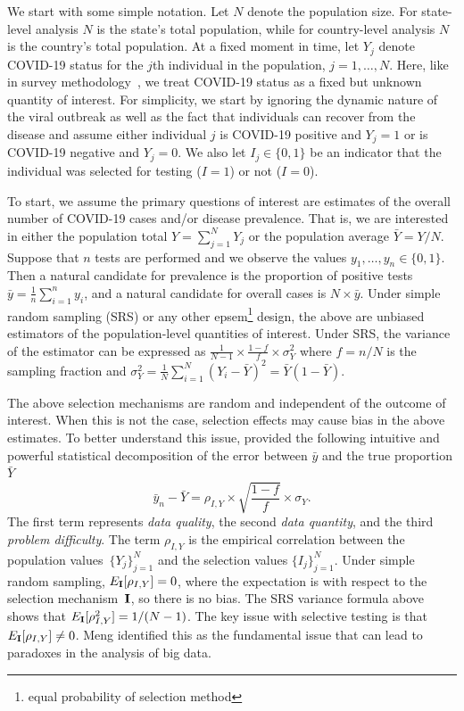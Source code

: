 \documentclass[aoas]{amsart}
\def\I{\bf I}
\begin{document}
We start with some simple notation.  Let $N$ denote the population size.  For state-level analysis $N$ is the state's total population, while for country-level analysis $N$ is the country's total population.  At a fixed moment in time, let $Y_j$ denote COVID-19 status for the $j$th individual in the population, $j=1,\ldots, N$. Here, like in survey methodology~\citep{Cochran77}, we treat COVID-19 status as a fixed but unknown quantity of interest. For simplicity, we start by ignoring the dynamic nature of the viral outbreak as well as the fact that individuals can recover from the disease and assume either individual $j$ is COVID-19 positive and $Y_j=1$ or is COVID-19 negative and $Y_j=0$. We also let $I_j \in \{0,1\}$ be an indicator that the individual was selected for testing ($I = 1$) or not ($I=0$).

To start, we assume the primary questions of interest are estimates of the overall number of COVID-19 cases and/or disease prevalence. That is, we are interested in either the population total $Y = \sum_{j=1}^N Y_j$ or the population average $\bar Y = Y/N$. Suppose that $n$ tests are performed and we observe the values $y_1, \ldots, y_n \in \{0,1\}$.  Then a natural candidate for prevalence is the proportion of positive tests $\bar y = \frac{1}{n} \sum_{i=1}^n y_i$, and a natural candidate for overall cases is $N \times \bar y$.
Under simple random sampling (SRS) or any other epsem\footnote{equal probability of selection method} design, the above are unbiased estimators of the population-level quantities of interest.  Under SRS, the variance of the estimator can be expressed as $\frac{1}{N-1} \times \frac{1-f}{f} \times \sigma_Y^2$ where $f = n/N$ is the sampling fraction and $\sigma_Y^2 = \frac{1}{N} \sum_{i=1}^N (Y_i - \bar Y)^2 = \bar Y (1- \bar Y)$.

The above selection mechanisms are random and independent of the outcome of interest. When this is not the case, selection effects may cause bias in the above estimates. To better understand this issue, \cite{Meng2018} provided the following intuitive and powerful statistical decomposition of the error between $\bar y$ and the true proportion $\bar Y$
$$
\bar y_n - \bar Y =  \rho_{I, Y} \times \sqrt{\frac{1-f}{f}} \times \sigma_Y.
$$
The first term represents \emph{data quality}, the second \emph{data quantity}, and the third \emph{problem difficulty}. The term $\rho_{I,Y}$ is the empirical correlation between the population values~$\{ Y_j \}_{j=1}^N$ and the selection values $\{ I_j \}_{j=1}^N$.  Under simple random sampling, $E_{\I} [ \rho_{I,Y} ] = 0$, where the expectation is with respect to the selection mechanism~$\I$, so there is no bias.  The SRS variance formula above shows that $E_{\I} [ \rho_{I,Y}^2 ]  = 1/(N-1)$.  The key issue with selective testing is that $E_{\I} [ \rho_{I,Y} ] \neq 0$.  Meng identified this as the fundamental issue that can lead to paradoxes in the analysis of big data.
\end{document}
